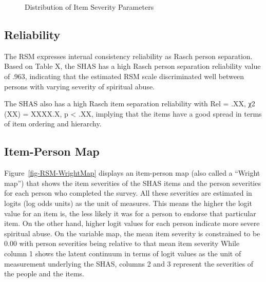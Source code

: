 \documentclass[
  letterpaper,
]{article}
\begin{document}
\begin{longtable}[t]{>{\raggedright\arraybackslash}p{11cm}ccccc}
\end{longtable}

\begin{figure}


\caption{\label{fig-RSM-item-histogram}Distribution of Item Severity
Parameters}

\end{figure}%

\subsection*{Reliability}\label{reliability}

The RSM expresses internal consistency reliability as Rasch person
separation. Based on Table X, the SHAS has a high Rasch person
separation reliability value of .963, indicating that the estimated RSM
scale discriminated well between persons with varying severity of
spiritual abuse.

The SHAS also has a high Rasch item separation reliability with Rel =
.XX, χ2 (XX) = XXXX.X, p \textless{} .XX, implying that the items have a
good spread in terms of item ordering and hierarchy.

\subsection*{Item-Person Map}\label{item-person-map}

Figure~\ref{fig-RSM-WrightMap} displays an item-person map (also called
a ``Wright map'') that shows the item severities of the SHAS items and
the person severities for each person who completed the survey. All
these severities are estimated in logits (log odds units) as the unit of
measures. This means the higher the logit value for an item is, the less
likely it was for a person to endorse that particular item. On the other
hand, higher logit values for each person indicate more severe spiritual
abuse. On the variable map, the mean item severity is constrained to be
0.00 with person severities being relative to that mean item severity
While column 1 shows the latent continuum in terms of logit values as
the unit of measurement underlying the SHAS, columns 2 and 3 represent
the severities of the people and the items.
\end{document}
